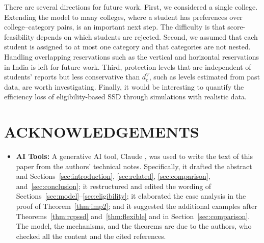 \documentclass[a4paper,twoside]{article}
\theoremstyle{definition}
\newcommand{\dV}{d^{V}}
\begin{document}
There are several directions for future work.
First, we considered a single college. Extending the model to many colleges, where a
student has preferences over college--category pairs, is an important next step.
The difficulty is that score-feasibility depends on which students are rejected.
Second, we assumed that each student is assigned to at most one category and that
categories are not nested. Handling overlapping reservations such as the vertical and
horizontal reservations in India \cite{SoYe22a} is left for future work.
Third, protection levels that are independent of students' reports but less
conservative than $\dV_c$, such as levels estimated from past data, are worth
investigating.
Finally, it would be interesting to quantify the efficiency loss of eligibility-based
SSD through simulations with realistic data.


\section*{\uppercase{Acknowledgements}}

\begin{itemize}
  \item \textbf{AI Tools:} A generative AI tool, Claude \cite{Anthropic26a}, was used to write the text of this paper from the authors' technical notes. Specifically, it drafted the abstract and Sections~\ref{sec:introduction}, \ref{sec:related}, \ref{sec:comparison}, and~\ref{sec:conclusion}; it restructured and edited the wording of Sections~\ref{sec:model}--\ref{sec:eligibility}; it elaborated the case analysis in the proof of Theorem~\ref{thm:imp2}; and it suggested the additional examples after Theorems~\ref{thm:rcpssd} and~\ref{thm:flexible} and in Section~\ref{sec:comparison}. The model, the mechanisms, and the theorems are due to the authors, who checked all the content and the cited references.
\end{itemize}



{\small
}
\end{document}
